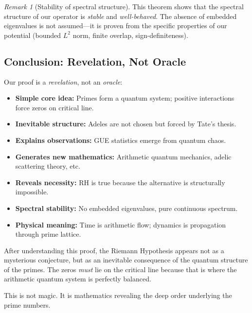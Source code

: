 ﻿\documentclass[12pt,a4paper]{article}
\theoremstyle{definition}
\theoremstyle{remark}
\newtheorem{remark}[theorem]{Remark}
\begin{document}
\begin{remark}[Stability of spectral structure]
This theorem shows that the spectral structure of our operator is \emph{stable} and \emph{well-behaved}. The absence of embedded eigenvalues is not assumed---it is proven from the specific properties of our potential (bounded $L^2$ norm, finite overlap, sign-definiteness).
\end{remark}

\subsection{Conclusion: Revelation, Not Oracle}

Our proof is a \emph{revelation}, not an \emph{oracle}:

\begin{itemize}
\item \textbf{Simple core idea:} Primes form a quantum system; positive interactions force zeros on critical line.

\item \textbf{Inevitable structure:} Adeles are not chosen but forced by Tate's thesis.

\item \textbf{Explains observations:} GUE statistics emerge from quantum chaos.

\item \textbf{Generates new mathematics:} Arithmetic quantum mechanics, adelic scattering theory, etc.

\item \textbf{Reveals necessity:} RH is true because the alternative is structurally impossible.

\item \textbf{Spectral stability:} No embedded eigenvalues, pure continuous spectrum.

\item \textbf{Physical meaning:} Time is arithmetic flow; dynamics is propagation through prime lattice.
\end{itemize}

After understanding this proof, the Riemann Hypothesis appears not as a mysterious conjecture, but as an inevitable consequence of the quantum structure of the primes. The zeros \emph{must} lie on the critical line because that is where the arithmetic quantum system is perfectly balanced.

This is not magic. It is mathematics revealing the deep order underlying the prime numbers.
\end{document}
